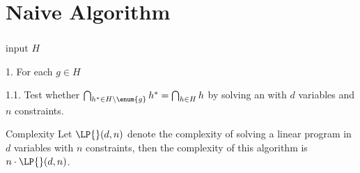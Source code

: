 \section{Naive Algorithm}
\begin{frame}\frametitle{\insertsection}\justifying
\begin{algo}[(Naive)]
\item[input] \(H\)
\item[1.] For each \(g \in H\)
\item[1.1.] Test whether \(\bigcap_{h^* \in H \setminus \enum{g}} h^* = \bigcap_{h \in H}
h\) by solving an \LP{} with \(d\) variables and \(n\) constraints.
\end{algo}
\begin{ebox}{Complexity}
	Let \(\LP{}(d,n)\) denote the complexity of solving a linear program in
	\(d\) variables with \(n\) constraints, then the complexity of this
	algorithm is \(n\cdot\LP{}(d,n)\).
\end{ebox}
\end{frame}
